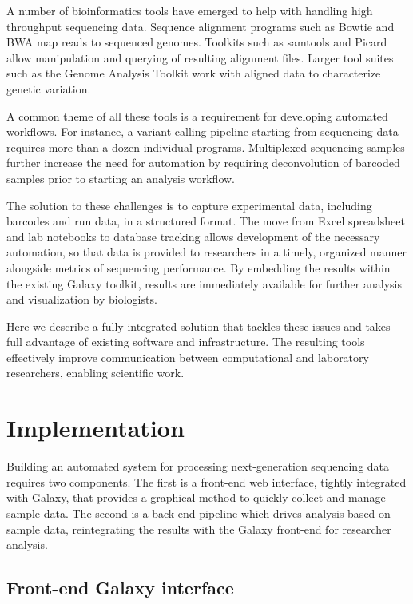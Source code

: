 \documentclass[10pt]{bmc_article}
\newenvironment{bmcformat}{\begin{raggedright}\baselineskip20pt\sloppy\setboolean{publ}{false}}{\end{raggedright}\baselineskip20pt\sloppy}
\begin{document}
\begin{bmcformat}
A number of bioinformatics tools have emerged to help with handling
high throughput sequencing data. Sequence alignment programs such as
Bowtie \cite{langmead_ultrafast_2009} and BWA \cite{li_fast_2009}
map reads to sequenced genomes. Toolkits such
as samtools \cite{li_sequence_2009} and Picard \cite{_picard_????}
allow manipulation and querying of resulting alignment files. Larger
tool suites such as the Genome Analysis Toolkit
\cite{mckenna_genome_2010} work with aligned data to characterize
genetic variation.

A common theme of all these tools is a requirement for developing
automated workflows. For instance, a variant calling pipeline starting
from sequencing data requires more than a dozen individual
programs. Multiplexed sequencing samples further increase the need for
automation by requiring deconvolution of barcoded samples prior to
starting an analysis workflow.

The solution to these challenges is to capture experimental data,
including barcodes and run data, in a structured format. The move from
Excel spreadsheet and lab notebooks to database tracking allows development of the
necessary automation, so that data is provided to researchers in a
timely, organized manner alongside metrics of sequencing performance.
By embedding the results within the existing Galaxy toolkit, results
are immediately available for further analysis and visualization by
biologists.

Here we describe a fully integrated solution that tackles these
issues and takes full advantage of existing software and
infrastructure. The resulting tools effectively improve communication
between computational and laboratory researchers, enabling scientific work.

\section*{Implementation}

Building an automated system for processing next-generation sequencing
data requires two components. The first is a front-end web interface,
tightly integrated with Galaxy, that provides a graphical method to
quickly collect and manage sample data. The second is a back-end
pipeline which drives analysis based on sample data, reintegrating
the results with the Galaxy front-end for researcher analysis.

\subsection*{Front-end Galaxy interface}


\end{bmcformat}
\end{document}
